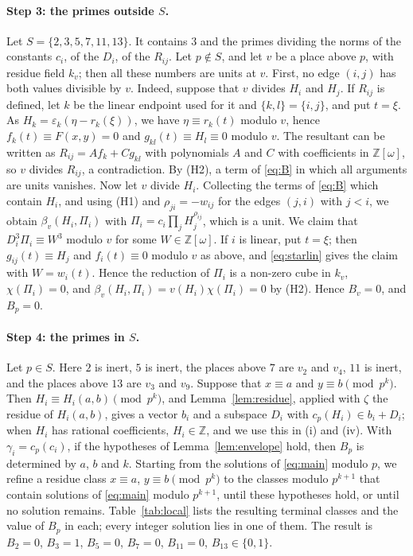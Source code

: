 \documentclass[11pt]{article}
\newcommand{\Z}{\mathbb{Z}}
\begin{document}
\paragraph{Step 3: the primes outside $S$.} Let $S=\{2,3,5,7,11,13\}$. It contains $3$ and the primes dividing the norms of the constants $c_i$, of the $D_i$, of the $R_{ij}$. Let $p\notin S$, and let $v$ be a place above $p$, with residue field $k_v$; then all these numbers are units at $v$. First, no edge $(i,j)$ has both values divisible by $v$. Indeed, suppose that $v$ divides $H_i$ and $H_j$. If $R_{ij}$ is defined, let $k$ be the linear endpoint used for it and $\{k,l\}=\{i,j\}$, and put $t=\xi$. As $H_k=\varepsilon_k(\eta-r_k(\xi))$, we have $\eta\equiv r_k(t)$ modulo $v$, hence $f_k(t)\equiv F(x,y)=0$ and $g_{kl}(t)\equiv H_l\equiv0$ modulo $v$. The resultant can be written as $R_{ij}=Af_k+Cg_{kl}$ with polynomials $A$ and $C$ with coefficients in $\Z[\omega]$, so $v$ divides $R_{ij}$, a contradiction. By (H2), a term of \eqref{eq:B} in which all arguments are units vanishes. Now let $v$ divide $H_i$. Collecting the terms of \eqref{eq:B} which contain $H_i$, and using (H1) and $\rho_{ji}=-w_{ij}$ for the edges $(j,i)$ with $j<i$, we obtain $\beta_v(H_i,\Pi_i)$ with $\Pi_i=c_i\prod_jH_j^{\rho_{ij}}$, which is a unit. We claim that $D_i^3\Pi_i\equiv W^3$ modulo $v$ for some $W\in\Z[\omega]$. If $i$ is linear, put $t=\xi$; then $g_{ij}(t)\equiv H_j$ and $f_i(t)\equiv0$ modulo $v$ as above, and \eqref{eq:starlin} gives the claim with $W=w_i(t)$. Hence the reduction of $\Pi_i$ is a non-zero cube in $k_v$, $\chi(\Pi_i)=0$, and $\beta_v(H_i,\Pi_i)=v(H_i)\chi(\Pi_i)=0$ by (H2). Hence $B_v=0$, and $B_p=0$.

\paragraph{Step 4: the primes in $S$.} Let $p\in S$. Here $2$ is inert, $5$ is inert, the places above $7$ are $v_{2}$ and $v_{4}$, $11$ is inert, and the places above $13$ are $v_{3}$ and $v_{9}$. Suppose that $x\equiv a$ and $y\equiv b\pmod{p^k}$. Then $H_i\equiv H_i(a,b)\pmod{p^k}$, and Lemma~\ref{lem:residue}, applied with $\zeta$ the residue of $H_i(a,b)$, gives a vector $b_i$ and a subspace $D_i$ with $c_p(H_i)\in b_i+D_i$; when $H_i$ has rational coefficients, $H_i\in\Z$, and we use this in (i) and (iv). With $\gamma_i=c_p(c_i)$, if the hypotheses of Lemma~\ref{lem:envelope} hold, then $B_p$ is determined by $a$, $b$ and $k$. Starting from the solutions of \eqref{eq:main} modulo $p$, we refine a residue class $x\equiv a$, $y\equiv b\pmod{p^k}$ to the classes modulo $p^{k+1}$ that contain solutions of \eqref{eq:main} modulo $p^{k+1}$, until these hypotheses hold, or until no solution remains. Table~\ref{tab:local} lists the resulting terminal classes and the value of $B_p$ in each; every integer solution lies in one of them. The result is $B_{2}=0$, $B_{3}=1$, $B_{5}=0$, $B_{7}=0$, $B_{11}=0$, $B_{13}\in\{0,1\}$.
\end{document}
